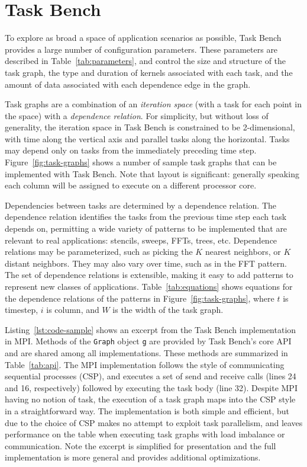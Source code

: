 \section{Task Bench}
\label{sec:task-bench}



To explore as broad a space of application scenarios as possible, Task
Bench provides a large number of configuration parameters. These
parameters are described in
Table~\ref{tab:parameters}, and control the size and
structure of the task graph, the type and duration of kernels
associated with each task, and the amount of data associated with
each dependence edge in the graph.

Task graphs are a combination of an \emph{iteration space} (with a task for
each point in the space) with a \emph{dependence relation}.
For simplicity, but without loss of generality, the iteration space in
Task Bench is constrained to be 2-dimensional, with time along
the vertical axis and parallel tasks along the
horizontal. Tasks may depend only on tasks from the immediately
preceding time step. Figure~\ref{fig:task-graphs} shows a number of sample task
graphs that can be implemented with Task Bench. Note that layout is
significant: generally speaking each column will be
assigned to execute on a different processor core.

Dependencies between tasks are determined by a dependence
relation. The
dependence relation identifies the tasks from the
previous time step each task depends on, permitting a wide variety
of patterns to be implemented that are relevant to real
applications: stencils,
sweeps, FFTs, trees, etc. Dependence relations may be
parameterized, such as picking the $K$ nearest neighbors, or $K$
distant neighbors. They may also vary over time, such as in the FFT pattern. The set of dependence relations is extensible, making it easy to add patterns to represent new classes of applications. Table~\ref{tab:equations} shows equations for the
dependence relations of the patterns in Figure~\ref{fig:task-graphs},
where $t$ is timestep, $i$ is column, and $W$ is the width of the task
graph.




Listing~\ref{lst:code-sample} shows an excerpt from the Task Bench
implementation in MPI. Methods of the \lstinline{Graph} object
\lstinline{g} are provided by Task Bench's core API and are shared
among all implementations. These methods are summarized in
Table~\ref{tab:api}. The MPI implementation follows the style of
communicating sequential processes (CSP), and executes a set of send
and receive calls (lines 24 and 16, respectively) followed by
executing the task body (line 32). Despite MPI having no notion of
task, the execution of a task graph maps into the CSP style in a
straightforward way. The implementation is both simple and efficient,
but due to the choice of CSP makes no attempt to exploit task
parallelism, and leaves performance on the table when executing task
graphs with load imbalance or communication. Note the excerpt is
simplified for presentation and the full implementation is more
general and provides additional optimizations.

